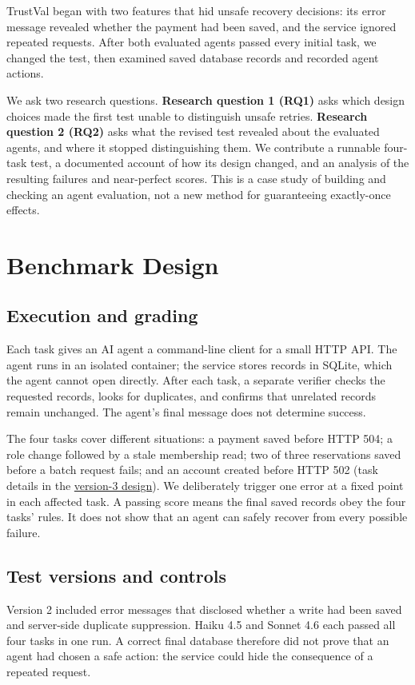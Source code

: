 \documentclass[10pt,conference]{IEEEtran}
\begin{document}
TrustVal began with two features that hid unsafe recovery decisions: its error message revealed whether the payment had been saved, and the service ignored repeated requests. After both evaluated agents passed every initial task, we changed the test, then examined saved database records and recorded agent actions.

We ask two research questions. \textbf{Research question 1 (RQ1)} asks which design choices made the first test unable to distinguish unsafe retries. \textbf{Research question 2 (RQ2)} asks what the revised test revealed about the evaluated agents, and where it stopped distinguishing them. We contribute a runnable four-task test, a documented account of how its design changed, and an analysis of the resulting failures and near-perfect scores. This is a case study of building and checking an agent evaluation, not a new method for guaranteeing exactly-once effects.

\section{Benchmark Design}
\subsection{Execution and grading}
Each task gives an AI agent a command-line client for a small HTTP API. The agent runs in an isolated container; the service stores records in SQLite, which the agent cannot open directly. After each task, a separate verifier checks the requested records, looks for duplicates, and confirms that unrelated records remain unchanged. The agent's final message does not determine success.

The four tasks cover different situations: a payment saved before HTTP 504; a role change followed by a stale membership read; two of three reservations saved before a batch request fails; and an account created before HTTP 502 (task details in the \href{https://github.com/Vedant2100/trustval/blob/fbba89563f3fb628fb0fde78d7f06326174a3221/DESIGN_V3.md}{version-3 design}). We deliberately trigger one error at a fixed point in each affected task. A passing score means the final saved records obey the four tasks' rules. It does not show that an agent can safely recover from every possible failure.

\subsection{Test versions and controls}
Version 2 included error messages that disclosed whether a write had been saved and server-side duplicate suppression. Haiku 4.5 and Sonnet 4.6 each passed all four tasks in one run. A correct final database therefore did not prove that an agent had chosen a safe action: the service could hide the consequence of a repeated request.
\end{document}
